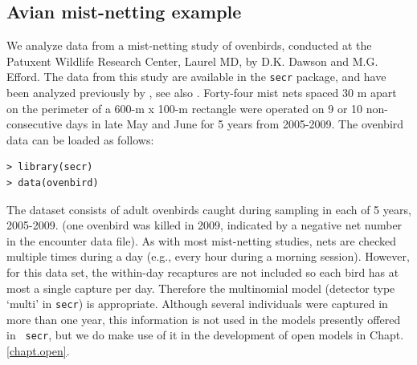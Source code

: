 \subsection{Avian mist-netting example}
\label{poisson-mn.sec.ovenbird}

We analyze data from a mist-netting study of ovenbirds, conducted at
the Patuxent Wildlife Research Center, Laurel MD, by D.K. Dawson and M.G.
Efford. The data from this study are available in the \mbox{\tt secr}
package, and have been analyzed previously by
\citet{efford_etal:2004}, see also \citet{borchers_efford:2008}.
Forty-four mist nets spaced 30 m apart on the perimeter of a 600-m x
100-m rectangle were operated on 9 or 10 non-consecutive days in late
May and June for 5 years from 2005-2009.  
The ovenbird
data can be loaded as follows:
\begin{verbatim}
> library(secr)
> data(ovenbird)
\end{verbatim}
The dataset consists of adult ovenbirds caught during sampling in each
of 5 years, 2005-2009. (one ovenbird was killed in 2009, indicated by
a negative net number in the encounter data file).
As with most mist-netting studies, nets are checked multiple times
during a day (e.g., every hour during a morning session). However, for
this data set, the within-day recaptures are not included so each bird
has at most a single capture per day. Therefore the multinomial model
(detector type `multi' in \mbox{\tt secr}) is appropriate.
 Although
several individuals were captured in more than one year, this
information is not used in the models presently offered in \mbox{\tt
  secr}, but we do make use of it in the development of open models in
Chapt. \ref{chapt.open}.
%


